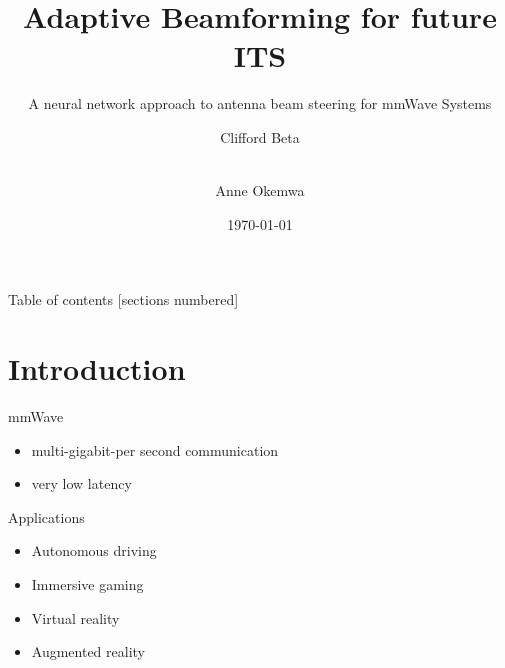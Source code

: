 \documentclass[10pt]{beamer}
\title{Adaptive Beamforming for future ITS}
\subtitle{A neural network approach to antenna beam steering for mmWave Systems}
\author{Clifford Beta \and \\Anne Okemwa}
\date{\today}
\begin{document}
\maketitle

\begin{frame}{Table of contents}
  [sections numbered]
  \tableofcontents[hideallsubsections]
\end{frame}
    
\section{Introduction}

\begin{frame}{mmWave}
  \begin{itemize}[<+- | alert@+>]
    \item multi-gigabit-per second communication
    \item very low latency
  \end{itemize}
\end{frame}
{
\begin{frame}{Applications}
  \begin{itemize}[<+- | alert@+>]
    \item Autonomous driving
    \item Immersive gaming
    \item Virtual reality
    \item Augmented reality
  \end{itemize}
\end{frame}
}
\end{document}
